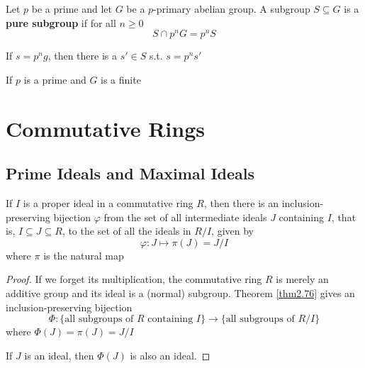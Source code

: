\documentclass[11pt]{article}
\begin{document}
\begin{definition}[]
Let \(p\) be a prime and let \(G\) be a \(p\)-primary abelian group. A subgroup
\(S\subseteq G\) is a \textbf{pure subgroup} if for all \(n\ge 0\)
\begin{equation*}
S\cap p^nG=p^nS
\end{equation*}
\end{definition}

If \(s=p^ng\), then there is a \(s'\in S\) s.t. \(s=p^ns'\)

\begin{lemma}[]
If \(p\) is a prime and \(G\) is a finite 
\end{lemma}
\section{Commutative Rings }
\label{sec:orgfd5b839}
\subsection{Prime Ideals and Maximal Ideals}
\label{sec:orgf717934}
\begin{proposition}
If \(I\) is a proper ideal in a commutative ring \(R\), then there is an
inclusion-preserving bijection \(\varphi\) from the set of all intermediate ideals \(J\)
containing \(I\), that is, \(I\subseteq J\subseteq R\), to the set of all the
ideals in \(R/I\), given by
\begin{equation*}
\varphi:J\mapsto\pi(J)=J/I
\end{equation*}
where \(\pi\) is the natural map
\begin{center}
\end{center}
\end{proposition}

\begin{proof}
If we forget its multiplication, the commutative ring \(R\) is merely an
additive group and its ideal is a (normal) subgroup. Theorem \ref{thm2.76}
gives an inclusion-preserving bijection
\begin{equation*}
\Phi:\{\text{all subgroups of $R$ containing $I$}\}\to 
\{\text{all subgroups of $R/I$}\}
\end{equation*}
where \(\Phi(J)=\pi(J)=J/I\)

If \(J\) is an ideal, then \(\Phi(J)\) is also an ideal.
\end{proof}
\end{document}

